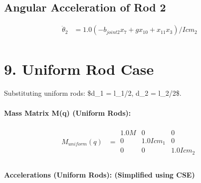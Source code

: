 \documentclass{article}%
\begin{document}
%
\subsection{Angular Acceleration of Rod 2}%
\label{subsec:AngularAccelerationofRod2}%
\begin{align*}%
\ddot{\theta}_2 &= \displaystyle 1.0 \left(- b_{joint2} x_{7} + g x_{10} + x_{11} x_{3}\right) / Icm_{2} \\%
\end{align*}

%
\section{9. Uniform Rod Case}%
\label{sec:9.UniformRodCase}%
Substituting uniform rods: \$d\_1 = l\_1/2, d\_2 = l\_2/2\$.%
\paragraph{\textbf{Mass Matrix M(q) (Uniform Rods):}}%
\label{para:textbfMassMatrixM(q)(UniformRods)}%

%
\begin{align*}%
M_{uniform}(q) &= \displaystyle \begin{matrix}1.0 M & 0 & 0\\0 & 1.0 Icm_{1} & 0\\0 & 0 & 1.0 Icm_{2}\end{matrix} \\%
\end{align*}%
\paragraph{\textbf{Accelerations (Uniform Rods): (Simplified using CSE)}}%
\label{para:textbfAccelerations(UniformRods)(SimplifiedusingCSE)}%
\end{document}
